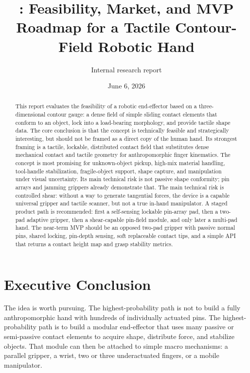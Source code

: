 \documentclass[11pt]{article}
\title{\GaugeHand: Feasibility, Market, and MVP Roadmap for a Tactile Contour-Field Robotic Hand}
\author{Internal research report}
\date{June 6, 2026}
\begin{document}
\maketitle

\begin{abstract}
This report evaluates the feasibility of a robotic end-effector based on a three-dimensional contour gauge: a dense field of simple sliding contact elements that conform to an object, lock into a load-bearing morphology, and provide tactile shape data. The core conclusion is that the concept is technically feasible and strategically interesting, but should not be framed as a direct copy of the human hand. Its strongest framing is a tactile, lockable, distributed contact field that substitutes dense mechanical contact and tactile geometry for anthropomorphic finger kinematics. The concept is most promising for unknown-object pickup, high-mix material handling, tool-handle stabilization, fragile-object support, shape capture, and manipulation under visual uncertainty. Its main technical risk is not passive shape conformity; pin arrays and jamming grippers already demonstrate that. The main technical risk is controlled shear: without a way to generate tangential forces, the device is a capable universal gripper and tactile scanner, but not a true in-hand manipulator. A staged product path is recommended: first a self-sensing lockable pin-array pad, then a two-pad adaptive gripper, then a shear-capable pin-field module, and only later a multi-pad hand. The near-term MVP should be an opposed two-pad gripper with passive normal pins, shared locking, pin-depth sensing, soft replaceable contact tips, and a simple API that returns a contact height map and grasp stability metrics.
\end{abstract}

\tableofcontents
\newpage

\section{Executive Conclusion}

The idea is worth pursuing. The highest-probability path is not to build a fully anthropomorphic hand with hundreds of individually actuated pins. The highest-probability path is to build a modular end-effector that uses many passive or semi-passive contact elements to acquire shape, distribute force, and stabilize objects. That module can then be attached to simple macro mechanisms: a parallel gripper, a wrist, two or three underactuated fingers, or a mobile manipulator.
\end{document}

